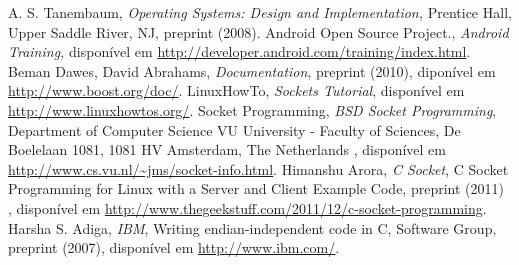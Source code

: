 \documentclass[12pt,a4paper]{article}
\begin{document}
\newpage
\begin{thebibliography}{99}

 A. S. Tanembaum, {\it Operating Systems: Design and Implementation,} Prentice Hall, Upper Saddle River, NJ, preprint (2008).
 Android Open Source Project., {\it Android Training,}  disponível em \url{http://developer.android.com/training/index.html}.
 Beman Dawes, David Abrahams, \emph{Documentation},  preprint (2010), diponível em \url{http://www.boost.org/doc/}.
 LinuxHowTo, \emph{Sockets Tutorial}, disponível em \url{http://www.linuxhowtos.org/}.
 Socket Programming, \emph{BSD Socket Programming}, Department of Computer Science VU University - Faculty of Sciences, De Boelelaan 1081, 1081 HV Amsterdam, The Netherlands , disponível em \url{http://www.cs.vu.nl/~jms/socket-info.html}.
 Himanshu Arora, \emph{C Socket}, C Socket Programming for Linux with a Server and Client Example Code, preprint (2011) , disponível em \url{http://www.thegeekstuff.com/2011/12/c-socket-programming}.
 Harsha S. Adiga, \emph{IBM}, Writing endian-independent code in C, Software Group, preprint (2007), disponível em \url{http://www.ibm.com/}.



\end{thebibliography}
\end{document}
